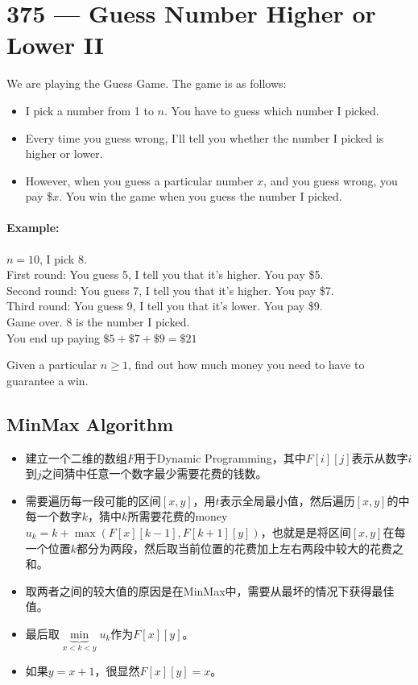 \section{375 --- Guess Number Higher or Lower II}
We are playing the Guess Game. The game is as follows:

\begin{itemize}
\item I pick a number from 1 to $ n $. You have to guess which number I picked.

\item Every time you guess wrong, I'll tell you whether the number I picked is higher or lower.

\item However, when you guess a particular number $ x $, and you guess wrong, you pay \$$x$. You win the game when you guess the number I picked.
\end{itemize}

\paragraph{Example:}

\begin{flushleft}
$ n = 10 $, I pick 8.
\\
First round:  You guess 5, I tell you that it's higher. You pay \$5.
\\
Second round: You guess 7, I tell you that it's higher. You pay \$7.
\\
Third round:  You guess 9, I tell you that it's lower. You pay \$9.
\\
Game over. 8 is the number I picked.
\\
You end up paying $\$5 + \$7 + \$9 = \$21$
\end{flushleft}

Given a particular $n \geq 1$, find out how much money you need to have to guarantee a win.

\subsection{MinMax Algorithm}
\begin{itemize}
\item 建立一个二维的数组$F$用于Dynamic Programming，其中$F[i][j]$表示从数字$i$到$j$之间猜中任意一个数字最少需要花费的钱数。
\item 需要遍历每一段可能的区间$[x, y]$，用$t$表示全局最小值，然后遍历$ [x,y] $的中每一个数字$k$，猜中$k$所需要花费的money $u_k = k + \max(F[x][k - 1], F[k + 1][y])$，也就是是将区间$ [x,y] $在每一个位置$k$都分为两段，然后取当前位置的花费加上左右两段中较大的花费之和。
\item 取两者之间的较大值的原因是在MinMax中，需要从最坏的情况下获得最佳值。
\item 最后取$\underbrace{\min}_{x< k < y}u_k$作为$F[x][y]$。
\item 如果$y=x+1$，很显然$F[x][y]=x$。
\end{itemize}


